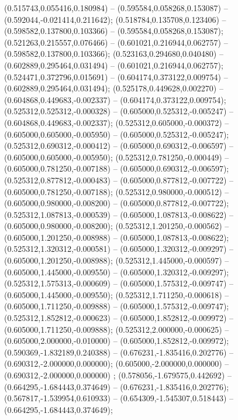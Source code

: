  (0.515743,0.055416,0.180984) -- (0.595584,0.058268,0.153087) -- (0.592044,-0.021414,0.211642);
 (0.518784,0.135708,0.123406) -- (0.598582,0.137800,0.103366) -- (0.595584,0.058268,0.153087);
 (0.521263,0.215557,0.076466) -- (0.601021,0.216944,0.062757) -- (0.598582,0.137800,0.103366);
 (0.523163,0.294680,0.040480) -- (0.602889,0.295464,0.031494) -- (0.601021,0.216944,0.062757);
 (0.524471,0.372796,0.015691) -- (0.604174,0.373122,0.009754) -- (0.602889,0.295464,0.031494);
 (0.525178,0.449628,0.002270) -- (0.604868,0.449683,-0.002337) -- (0.604174,0.373122,0.009754);
 (0.525312,0.525312,-0.000328) -- (0.605000,0.525312,-0.005247) -- (0.604868,0.449683,-0.002337);
 (0.525312,0.605000,-0.000372) -- (0.605000,0.605000,-0.005950) -- (0.605000,0.525312,-0.005247);
 (0.525312,0.690312,-0.000412) -- (0.605000,0.690312,-0.006597) -- (0.605000,0.605000,-0.005950);
 (0.525312,0.781250,-0.000449) -- (0.605000,0.781250,-0.007188) -- (0.605000,0.690312,-0.006597);
 (0.525312,0.877812,-0.000483) -- (0.605000,0.877812,-0.007722) -- (0.605000,0.781250,-0.007188);
 (0.525312,0.980000,-0.000512) -- (0.605000,0.980000,-0.008200) -- (0.605000,0.877812,-0.007722);
 (0.525312,1.087813,-0.000539) -- (0.605000,1.087813,-0.008622) -- (0.605000,0.980000,-0.008200);
 (0.525312,1.201250,-0.000562) -- (0.605000,1.201250,-0.008988) -- (0.605000,1.087813,-0.008622);
 (0.525312,1.320312,-0.000581) -- (0.605000,1.320312,-0.009297) -- (0.605000,1.201250,-0.008988);
 (0.525312,1.445000,-0.000597) -- (0.605000,1.445000,-0.009550) -- (0.605000,1.320312,-0.009297);
 (0.525312,1.575313,-0.000609) -- (0.605000,1.575312,-0.009747) -- (0.605000,1.445000,-0.009550);
 (0.525312,1.711250,-0.000618) -- (0.605000,1.711250,-0.009888) -- (0.605000,1.575312,-0.009747);
 (0.525312,1.852812,-0.000623) -- (0.605000,1.852812,-0.009972) -- (0.605000,1.711250,-0.009888);
 (0.525312,2.000000,-0.000625) -- (0.605000,2.000000,-0.010000) -- (0.605000,1.852812,-0.009972);
 (0.590369,-1.832189,0.240388) -- (0.676231,-1.835416,0.202776) -- (0.690312,-2.000000,0.000000);
 (0.605000,-2.000000,0.000000) -- (0.690312,-2.000000,0.000000) ;
 (0.578056,-1.679575,0.442692) -- (0.664295,-1.684443,0.374649) -- (0.676231,-1.835416,0.202776);
 (0.567817,-1.539954,0.610933) -- (0.654309,-1.545307,0.518443) -- (0.664295,-1.684443,0.374649);
